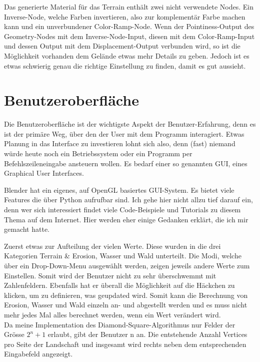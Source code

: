 \documentclass[12pt,twoside]{book}
\begin{document}
Das generierte Material f\"ur das Terrain enth\"alt zwei nicht verwendete Nodes. Ein Inverse-Node, welche Farben invertieren, also zur komplement\"ar Farbe machen kann und ein unverbundener Color-Ramp-Node. Wenn der \glqq Pointiness\grqq-Output des Geometry-Nodes mit dem Inverse-Node-Input, diesen mit dem Color-Ramp-Input und dessen Output mit dem \glqq Displacement\grqq-Output verbunden wird, so ist die M\"oglichkeit vorhanden dem Gel\"ande etwas mehr Details zu geben. Jedoch ist es etwas schwierig genau die richtige Einstellung zu finden, damit es gut aussieht. 

\section {Benutzeroberfl\"ache}

Die Benutzeroberfl\"ache ist der wichtigste Aspekt der Benutzer-Erfahrung, denn es ist der prim\"are Weg, \"uber den der User mit dem Programm interagiert. Etwas Planung in das Interface zu investieren lohnt sich also, denn (fast) niemand w\"urde heute noch ein Betriebssystem oder ein Programm per Befehlszeileneingabe ansteuern wollen.
Es bedarf einer so genannten GUI, eines Graphical User Interfaces.

Blender hat ein eigenes, auf OpenGL basiertes GUI-System. Es bietet viele Features die \"uber Python aufrufbar sind. Ich gehe hier nicht allzu tief darauf ein, denn wer sich interessiert findet viele Code-Beispiele und Tutorials zu diesem Thema auf dem Internet.
Hier werden eher einige Gedanken erkl\"art, die ich mir gemacht hatte.

Zuerst etwas zur Aufteilung der vielen Werte.
Diese wurden in die drei Kategorien Terrain \& Erosion, Wasser und Wald unterteilt. Die Modi, welche \"uber ein Drop-Down-Menu ausgew\"ahlt werden, zeigen jeweils andere Werte zum Einstellen. Somit wird der Benutzer nicht zu sehr \"uberschwemmt mit Zahlenfeldern.
Ebenfalls hat er \"uberall die M\"oglichkeit auf die H\"ackchen zu klicken, um zu definieren, was geupdated wird. Somit kann die Berechnung von Erosion, Wasser und Wald einzeln an- und abgestellt werden und es muss nicht mehr jedes Mal alles berechnet werden, wenn ein Wert ver\"andert wird.\\
Da meine Implementation des Diamond-Square-Algorithmus nur Felder der Gr\"osse \( 2^{n}+1\) erlaubt, gibt der Benutzer n an. Die entstehende Anzahl Vertices pro Seite der Landschaft und insgesamt wird rechts neben dem entsprechenden Eingabefeld angezeigt.
\end{document}
